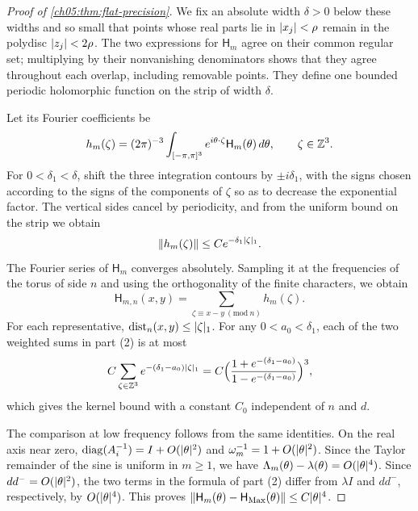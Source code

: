 \begin{proof}[Proof of \cref{ch05:thm:flat-precision}]
We fix an absolute width $\delta>0$ below these widths and so small that points whose real parts lie in $\lvert x_j\rvert<\rho$ remain in the polydisc $\lvert z_j\rvert<2\rho$. The two expressions for $\mathsf H_m$ agree on their common regular set; multiplying by their nonvanishing denominators shows that they agree throughout each overlap, including removable points. They define one bounded periodic holomorphic function on the strip of width $\delta$.

Let its Fourier coefficients be
\[
 h_m(\zeta)=(2\pi)^{-3}\int_{[-\pi,\pi]^3}e^{i\theta\cdot\zeta}\mathsf H_m(\theta)\,d\theta,\qquad\zeta\in\mathbb Z^3.
\]
For $0<\delta_1<\delta$, shift the three integration contours by $\pm i\delta_1$, with the signs chosen according to the signs of the components of $\zeta$ so as to decrease the exponential factor. The vertical sides cancel by periodicity, and from the uniform bound on the strip we obtain
\[
 \lVert h_m(\zeta)\rVert\le Ce^{-\delta_1\lvert \zeta\rvert_1}.
\]
The Fourier series of $\mathsf H_m$ converges absolutely. Sampling it at the frequencies of the torus of side $n$ and using the orthogonality of the finite characters, we obtain
\[
 \mathsf H_{m,n}(x,y)=\sum_{\zeta\equiv x-y\ (\mathrm{mod}\ n)}h_m(\zeta).
\]
For each representative, $\operatorname{dist}_n(x,y)\le\lvert \zeta\rvert_1$. For any $0<a_0<\delta_1$, each of the two weighted sums in part (2) is at most
\[
 C\sum_{\zeta\in\mathbb Z^3}e^{-(\delta_1-a_0)\lvert \zeta\rvert_1}=C\Bigl(\frac{1+e^{-(\delta_1-a_0)}}{1-e^{-(\delta_1-a_0)}}\Bigr)^3,
\]
which gives the kernel bound with a constant $C_0$ independent of $n$ and $d$.

The comparison at low frequency follows from the same identities. On the real axis near zero, $\operatorname{diag}(A_i^{-1})=I+O(\lvert \theta\rvert^2)$ and $\omega_m^{-1}=1+O(\lvert \theta\rvert^2)$. Since the Taylor remainder of the sine is uniform in $m\ge1$, we have $\Lambda_m(\theta)-\lambda(\theta)=O(\lvert \theta\rvert^4)$. Since $dd^-=O(\lvert \theta\rvert^2)$, the two terms in the formula of part (2) differ from $\lambda I$ and $dd^-$, respectively, by $O(\lvert \theta\rvert^4)$. This proves $\lVert \mathsf H_m(\theta)-\mathsf H_{\mathrm{Max}}(\theta)\rVert\le C\lvert \theta\rvert^4$.


\end{proof}
